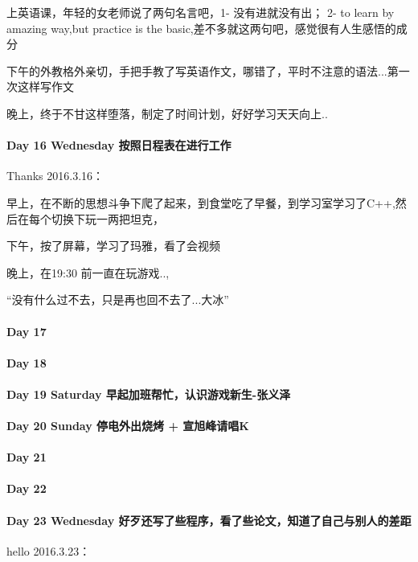 \documentclass[UTF8,a4paper,8pt]{ctexbook}
\begin{document}
	 	 上英语课，年轻的女老师说了两句名言吧，1- 没有进就没有出； 2- to learn by amazing way,but practice is the basic,差不多就这两句吧，感觉很有人生感悟的成分
	 	 
	 	 下午的外教格外亲切，手把手教了写英语作文，哪错了，平时不注意的语法...第一次这样写作文
	 	 
	 	 晚上，终于不甘这样堕落，制定了时间计划，好好学习天天向上..
	 \paragraph{Day 16  Wednesday  \quad   按照日程表在进行工作  }
		 Thanks 2016.3.16：
		 
		 早上，在不断的思想斗争下爬了起来，到食堂吃了早餐，到学习室学习了C++,然后在每个切换下玩一两把坦克，
		 
		 下午，按了屏幕，学习了玛雅，看了会视频
		 
		 晚上，在19:30 前一直在玩游戏.., 
		 
		 “没有什么过不去，只是再也回不去了...大冰”
 	 \paragraph{Day 17      \quad     }
 	 \paragraph{Day 18      \quad     }
 	 \paragraph{Day 19  Saturday    \quad   早起加班帮忙，认识游戏新生-张义泽  }
 	 \paragraph{Day 20  Sunday    \quad    停电外出烧烤 + 宣旭峰请唱K}
 	 \paragraph{Day 21      \quad     }
 	 \paragraph{Day 22      \quad     }
 	 \paragraph{Day 23  Wednesday    \quad  好歹还写了些程序，看了些论文，知道了自己与别人的差距  }
	 	 hello 2016.3.23：
	 	 
\end{document}
